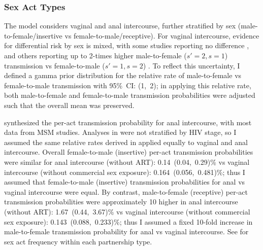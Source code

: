\subsubsection{Sex Act Types}\label{model.par.beta.sex}
The model considers vaginal and anal intercourse,
further stratified by sex (male-to-female/insertive vs female-to-male/receptive).
For vaginal intercourse, evidence for differential risk by sex is mixed,
with some studies reporting no difference \cite{Wawer2005,Hughes2012},
and others reporting up to 2-times higher male-to-female ($s'=2,s=1$) transmission
vs female-to-male ($s'=1,s=2$) \cite{Gregson2002a,Boily2009}.
To reflect this uncertainty, I defined a gamma prior distribution for
the relative rate of male-to-female vs female-to-male transmission with 95\%~CI: (1,~2);
in applying this relative rate, both male-to-female and female-to-male transmission probabilities
were adjusted such that the overall mean was preserved.
\par
\citet{Baggaley2018} synthesized the per-act transmission probability for anal intercourse,
with most data from MSM studies.
Analyses in \cite{Baggaley2018} were not stratified by HIV stage,
so I assumed the same relative rates derived in 
applied equally to vaginal and anal intercourse.
Overall female-to-male (insertive) per-act transmission probabilities were similar for
anal intercourse \cite{Baggaley2013} (without ART): 0.14~(0.04,~0.29)\% vs
vaginal intercourse \cite{Boily2009} (without commercial sex exposure): 0.164~(0.056,~0.481)\%;
thus I assumed that female-to-male (insertive) transmission probabilities
for anal vs vaginal intercourse were equal.
By contrast, male-to-female (receptive) per-act transmission probabilities were approximately 10 higher
in anal intercourse \cite{Baggaley2018} (without ART): 1.67~(0.44,~3.67)\% vs
vaginal intercourse \cite{Boily2009} (without commercial sex exposure): 0.143~(0.088,~0.233)\%;
thus I assumed a fixed 10-fold increase in male-to-female transmission probability
for anal vs vaginal intercourse.
See  for sex act frequency within each partnership type.
